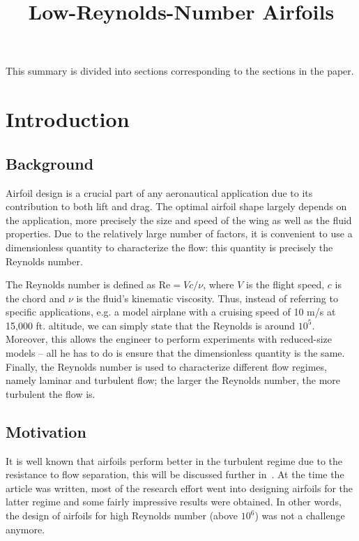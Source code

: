 \title{Low-Reynolds-Number Airfoils}
\author{}
\date{}
\maketitle
This summary is divided into sections corresponding to the sections in the paper.
\section{Introduction}
\label{sec:intro}

\subsection{Background}
\label{sub:Background}
Airfoil design is a crucial part of any aeronautical application due to its contribution to
both lift and drag. The optimal airfoil shape largely depends on the application, more
precisely the size and speed of the wing as well as the fluid properties. Due to the
relatively large number of factors, it is convenient to use a dimensionless quantity to
characterize the flow: this quantity is precisely the Reynolds number.

The Reynolds number is defined as $\mathrm{Re} = Vc/\nu$, where $V$ is the flight speed, $c$ is the
chord and $\nu$ is the fluid's kinematic viscosity. Thus, instead of referring to specific
applications, e.g. a model airplane with a cruising speed of 10 m/s at 15,000 ft. altitude,
we can simply state that the Reynolds is around $10^5$. Moreover, this allows the engineer
to perform experiments with reduced-size models -- all he has to do is ensure that the
dimensionless quantity is the same. Finally, the Reynolds number is used to characterize different
flow regimes, namely laminar and turbulent flow; the larger the Reynolds number, the more turbulent
the flow is.

\subsection{Motivation}
\label{sub:Motivation}
It is well known that airfoils perform better in the turbulent regime due to the resistance to flow
separation, this will be discussed further in~.
At the time the article was written, most of the research effort went into designing airfoils for the
latter regime and some fairly impressive results were obtained. In other words, the design of airfoils
for high Reynolds number (above $10^6$) was not a challenge anymore.


